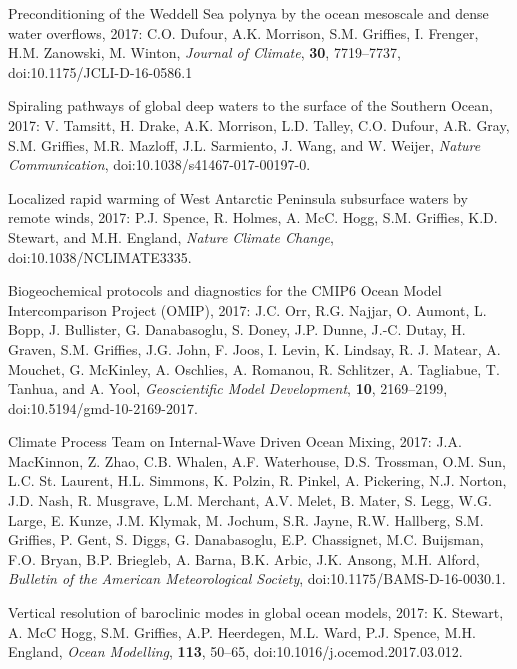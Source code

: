 \begin{etaremune}
\item Preconditioning of the Weddell Sea polynya by the ocean mesoscale and dense water overflows, 2017: C.O. Dufour, A.K. Morrison, S.M. Grif\/f\/ies, I. Frenger, H.M. Zanowski, M. Winton, {\it Journal of Climate}, {\bf 30}, 7719--7737, doi:10.1175/JCLI-D-16-0586.1

\item Spiraling pathways of global deep waters to the surface of the Southern Ocean, 2017: V. Tamsitt, H.  Drake, A.K. Morrison, L.D. Talley, C.O. Dufour, A.R. Gray, S.M. Grif\/f\/ies, M.R. Mazloff, J.L. Sarmiento, J. Wang, and W. Weijer, {\it Nature Communication}, doi:10.1038/s41467-017-00197-0.

\item Localized rapid warming of West Antarctic Peninsula subsurface waters by remote winds, 2017: P.J. Spence, R. Holmes, A. McC. Hogg,   S.M. Grif\/f\/ies, K.D. Stewart, and M.H. England, {\it Nature Climate Change}, doi:10.1038/NCLIMATE3335.

\item Biogeochemical protocols and diagnostics for the CMIP6 Ocean Model Intercomparison Project (OMIP), 2017: J.C. Orr, R.G. Najjar, O. Aumont, L.  Bopp, J. Bullister, G. Danabasoglu, S. Doney,  J.P. Dunne, J.-C. Dutay, H. Graven, S.M. Grif\/f\/ies, J.G. John, F. Joos, I. Levin, K. Lindsay, R. J. Matear, A. Mouchet, G. McKinley, A. Oschlies, A. Romanou, R. Schlitzer, A. Tagliabue, T. Tanhua, and A. Yool, {\it Geoscientific Model Development}, {\bf 10}, 2169--2199, doi:10.5194/gmd-10-2169-2017.

\item Climate Process Team on Internal-Wave Driven Ocean Mixing, 2017:  J.A. MacKinnon, Z. Zhao, C.B. Whalen, A.F. Waterhouse, D.S. Trossman, O.M. Sun, L.C. St. Laurent, H.L. Simmons, K. Polzin, R. Pinkel, A. Pickering, N.J. Norton, J.D. Nash, R. Musgrave, L.M. Merchant, A.V. Melet, B. Mater, S. Legg, W.G. Large, E. Kunze, J.M. Klymak,  M. Jochum, S.R. Jayne, R.W. Hallberg, S.M. Grif\/f\/ies, P. Gent, S. Diggs, G. Danabasoglu, E.P. Chassignet, M.C. Buijsman, F.O. Bryan, B.P. Briegleb, A. Barna, B.K. Arbic,  J.K. Ansong, M.H. Alford, {\it Bulletin of the American Meteorological Society}, doi:10.1175/BAMS-D-16-0030.1.

\item Vertical resolution of baroclinic modes in global ocean models,  2017: K. Stewart, A. McC Hogg, S.M. Grif\/f\/ies, A.P. Heerdegen, M.L. Ward, P.J. Spence, M.H. England,  {\it Ocean Modelling}, {\bf 113}, 50--65, doi:10.1016/j.ocemod.2017.03.012.



\end{etaremune}
